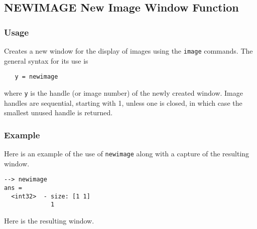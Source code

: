 %
%
%
\subsection{NEWIMAGE New Image Window Function}
\subsubsection{Usage}
Creates a new window for the display of images using the \verb|image| commands.
The general syntax for its use is
\begin{verbatim}
   y = newimage
\end{verbatim}
where \verb|y| is the handle (or image number) of the newly created window.  
Image handles are sequential, starting with 1, unless one is closed, in 
which case the smallest unused handle is returned.
\subsubsection{Example}
Here is an example of the use of \verb|newimage| along with a capture of the
resulting window.
\begin{verbatim}
--> newimage
ans =
  <int32>  - size: [1 1]
             1
\end{verbatim}
Here is the resulting window.

